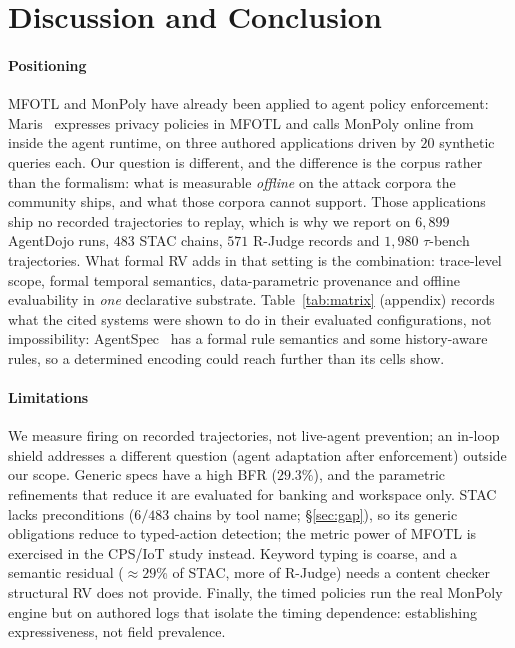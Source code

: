 \documentclass[sigconf]{acmart}
\begin{document}
\section{Discussion and Conclusion}
\label{sec:concl}

\paragraph{Positioning} MFOTL and MonPoly have already been applied to agent policy
enforcement: Maris~\cite{maris2026} expresses privacy policies in MFOTL and calls MonPoly
online from inside the agent runtime, on three authored applications driven by $20$
synthetic queries each. Our question is different, and the difference is the corpus
rather than the formalism: what is measurable \emph{offline} on the attack corpora the
community ships, and what those corpora cannot support. Those applications ship no
recorded trajectories to replay, which is why we report on $6{,}899$ AgentDojo runs,
$483$ STAC chains, $571$ R-Judge records and $1{,}980$ $\tau$-bench trajectories. What
formal RV adds in that setting is the combination: trace-level scope, formal temporal
semantics, data-parametric provenance and offline evaluability in \emph{one} declarative
substrate. Table~\ref{tab:matrix} (appendix) records what the cited systems were shown to
do in their evaluated configurations, not impossibility: AgentSpec~\cite{agentspec2026}
has a formal rule semantics and some history-aware rules, so a determined encoding could
reach further than its cells show.

\paragraph{Limitations} We measure firing on recorded trajectories, not live-agent
prevention; an in-loop shield addresses a different question (agent adaptation after
enforcement) outside our scope. Generic specs have a high BFR ($29.3\%$), and the
parametric refinements that reduce it are evaluated for banking and workspace only.
STAC lacks preconditions ($6/483$ chains by tool name; \S\ref{sec:gap}), so its generic obligations reduce to
typed-action detection; the metric power of MFOTL is exercised in the CPS/IoT study
instead. Keyword typing is coarse, and a semantic residual ($\approx$$29\%$ of STAC,
more of R-Judge) needs a content checker structural RV does not provide. Finally, the
timed policies run the real MonPoly engine but on authored logs that isolate the
timing dependence: establishing expressiveness, not field prevalence.
\end{document}
